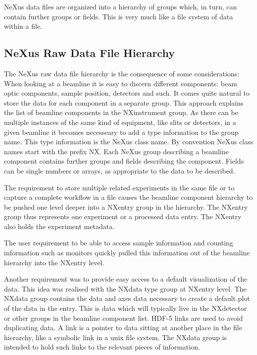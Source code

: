 \documentclass[%
 aip,
rsi,
 amsmath,amssymb,
 reprint,%
]{revtex4-1}
\begin{document}
NeXus data files are organized into a hierarchy of groups which, in turn, can contain further groups or fields. 
This is very much like a file system of data within a file. 

\subsection{NeXus Raw Data File Hierarchy}
The NeXus raw data file hierarchy is the consequence of some considerations: When looking at a beamline it is easy to 
discern different components: beam optic components, sample position, detectors and such. It comes quite natural to store the 
data for each component in a separate group. This approach explains the list of beamline components in the NXinstrument group. 
As there can be multiple instances of the same kind of equipment, like slits or detectors, in a given beamline it becomes necesseary
to add a type information to the group name. This type information is the NeXus class name. By convention NeXus class names start 
with the prefix NX. Each NeXus group describing a beamline
component contains further groups and fields describing the component. Fields can be single numbers or arrays, as appropriate to 
the data to be described.  

The requirement to store multiple related experiments in the same file or to capture 
a complete workflow in a file causes the beamline component hierarchy to be pushed one level deeper into a NXentry 
group in the hierarchy. The NXentry  group thus represents one experiment or a processed data entry. The NXentry also holds 
the experiment metadata. 

The user requirement to be able to access sample information and counting information such as monitors quickly 
pulled this information out of the beamline hierarchy into the NXentry level. 

Another requirement was to provide easy access to a default visualization of the data. This idea was realised with the 
NXdata type group at NXentry level. The NXdata group contains the data and axes data necessary to create a default plot of 
the data in the entry. This is data which will typically live in the NXdetector or other groups in the 
beamline component list. HDF-5 links are used to avoid duplicating data. A link 
is a pointer to data sitting at another place in the file hierarchy, like a symbolic link in a unix 
file system.  The NXdata group is intended to hold such links to the relevant pieces of information.
\end{document}
